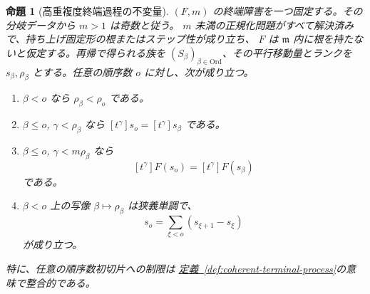 \documentclass[11pt,uplatex,dvipdfmx]{jsarticle}
\newcommand{\namedref}[2]{\hyperref[#2]{#1~\ref*{#2}}}
\theoremstyle{proofnote}
\newtheorem{proposition}[theorem]{命題}
\begin{document}
\begin{proposition}[高重複度終端過程の不変量]
\label{prop:terminal-process-invariant}
  \((F,m)\) の終端障害を一つ固定する。その分岐データから \(m>1\) は奇数と従う。
  \(m\) 未満の正規化問題がすべて解決済みで、持ち上げ固定形の根またはステップ性が成り立ち、
  \(F\) は \(\mathfrak m\) 内に根を持たないと仮定する。再帰で得られる族を
  \((S_\beta)_{\beta\in\mathrm{Ord}}\)、その平行移動量とランクを
  \(s_\beta,\rho_\beta\) とする。任意の順序数 \(o\) に対し、次が成り立つ。
  \begin{enumerate}[label=(\roman*)]
    \item \(\beta<o\) なら \(\rho_\beta<\rho_o\) である。
    \item \(\beta\le o\), \(\gamma<\rho_\beta\) なら
      \([t^\gamma]s_o=[t^\gamma]s_\beta\) である。
    \item \(\beta\le o\), \(\gamma<m\rho_\beta\) なら
      \[
        [t^\gamma]F(s_o)=[t^\gamma]F(s_\beta)
        \tag{EC}\label{eq:terminal-eval-coherence}
      \]
      である。
    \item \(\beta<o\) 上の写像 \(\beta\mapsto\rho_\beta\) は狭義単調で、
      \[
        s_o=\sum_{\xi<o}(s_{\xi+1}-s_\xi)
        \tag{HS}\label{eq:terminal-prefix-sum}
      \]
      が成り立つ。
  \end{enumerate}
  特に、任意の順序数初切片への制限は
  \namedref{定義}{def:coherent-terminal-process}の意味で整合的である。
\end{proposition}
\end{document}
